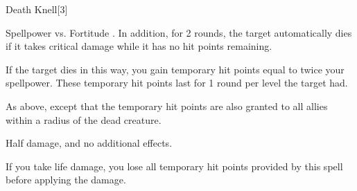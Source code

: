 \begin{spellsection}{Death Knell}[3]
    \begin{spellheader}
    \end{spellheader}
    \begin{spellcontent}
        \begin{spelltargetinginfo}
        \end{spelltargetinginfo}
        \begin{spelleffects}
            \begin{spellattack}{Spellpower vs. Fortitude}
                \spellsuccess {}. In addition, for 2 rounds, the target automatically dies if it takes critical damage while it has no hit points remaining.

                If the target dies in this way, you gain temporary hit points equal to twice your spellpower. These temporary hit points last for 1 round per level the target had.

                \spellcritical As above, except that the temporary hit points are also granted to all allies within a \arealarge radius of the dead creature.

                \spellfailure Half damage, and no additional effects.
            \end{spellattack}
        \end{spelleffects}
    \end{spellcontent}
    \begin{spellfooter}
        \spellnotes If you take life damage, you lose all temporary hit points provided by this spell before applying the damage.
        \miscastrandom
    \end{spellfooter}
    \begin{spellaugments}
    \end{spellaugments}
\end{spellsection}

